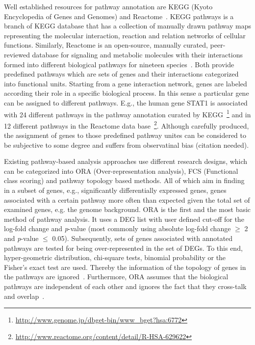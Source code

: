 \documentclass[10pt,a4paper,twocolumn]{article}
\newcommand{\TODO}[1]{\begingroup\color{red}#1\endgroup}
\begin{document}
Well established resources for pathway annotation are KEGG (Kyoto
Encyclopedia of Genes and Genomes)\cite{Kegg} and
Reactome~\cite{Reactome}. KEGG pathways is a branch of KEGG database
that has a collection of manually drawn pathway maps representing the
molecular interaction, reaction and relation networks of cellular
functions. Similarly, Reactome is an open-source, manually curated,
peer-reviewed database for signaling and metabolic molecules with
their interactions formed into different biological pathways for
nineteen species~\cite{Reactome}. Both provide predefined pathways
which are sets of genes and their interactions categorized into
functional units. Starting from a gene interaction network, genes are
labeled according their role in a specific biological process. In this
sense a particular gene can be assigned to different pathways. E.g.,
the human gene STAT1 is associated with 24 different pathways in the
pathway annotation curated by
KEGG~\footnote{\url{http://www.genome.jp/dbget-bin/www_bget?hsa:6772}}
and in 12 different pathways in the Reactome data
base~\footnote{\url{http://www.reactome.org/content/detail/R-HSA-629622}}.
Although carefully produced, the assignment of genes to those
predefined pathway unites can be considered to be subjective to some
degree and suffers from observatinal bias (\TODO{citation needed}).

Existing pathway-based analysis approaches use different research
designs, which can be categorized into ORA (Over-representation
analysis), FCS (Functional class scoring) and pathway topology based
methods. All of which aim in finding in a subset of genes, e.g.,
significantly differentially expressed genes, genes associated with a
certain pathway more often than expected given the total set of
examined genes, e.g. the genome background.  ORA is the first and the
most basic method of pathway analysis. It uses a DEG list with user
defined cut-off for the log-fold change and \textit{p}-value (most
commonly using absolute log-fold change $\geq$ 2 and \textit{p}-value
$\leq$ 0.05). Subsequently, sets of genes associated with annotated
pathways are tested for being over-represented in the set of DEGs. To
this end, hyper-geometric distribution, chi-square tests, binomial
probability or the Fisher’s exact test are used. Thereby the
information of the topology of genes in the pathways are
ignored~\cite{Bayer}. Furthermore, ORA assumes that the biological
pathways are independent of each other and ignores the fact that they
cross-talk and overlap~\cite{Khatri2012,Campos}.
\end{document}
